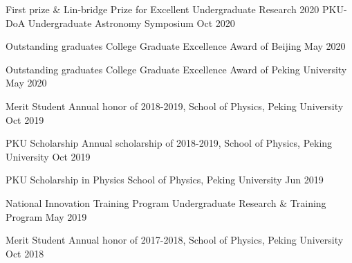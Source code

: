 




\begin{cvhonors}

\cvhonor
{First prize \& Lin-bridge Prize for Excellent Undergraduate Research} %
{2020 PKU-DoA Undergraduate Astronomy Symposium} %
{} %
{Oct 2020} %

\cvhonor
{Outstanding graduates} %
{College Graduate Excellence Award of Beijing} %
{} %
{May 2020} %

\cvhonor
{Outstanding graduates} %
{College Graduate Excellence Award of Peking University} %
{} %
{May 2020} %

\cvhonor
{Merit Student} %
{Annual honor of 2018-2019, School of Physics, Peking University} %
{} %
{Oct 2019} %


\cvhonor
{PKU Scholarship} %
{Annual scholarship of 2018-2019, School of Physics, Peking University} %
{} %
{Oct 2019} %

\cvhonor
{PKU Scholarship in Physics} %
{School of Physics, Peking University} %
{} %
{Jun 2019} %


\cvhonor
{National Innovation Training Program} %
{Undergraduate Research \& Training Program} %
{} %
{May 2019} %


\cvhonor
{Merit Student} %
{Annual honor of 2017-2018, School of Physics, Peking University} %
{} %
{Oct 2018} %


\end{cvhonors}
